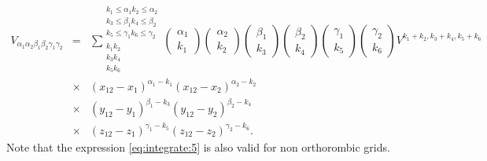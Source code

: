 \documentclass[prb]{revtex4}
\begin{document}
\begin{eqnarray}
  \label{eq:integrate:5}
  V_{\alpha_1\alpha_2\beta_1\beta_2\gamma_1\gamma_2} &=& \sum_{\substack{k_1 k_2\\
      k_3 k_4\\
      k_5 k_6}}^{\substack{k_1\leq \alpha_1k_2\leq\alpha_2\\
    k_3\leq\beta_1k_4\leq\beta_2\\
    k_5\leq\gamma_1k_6\leq\gamma_2}} \left(\begin{array}{c}
    \alpha_1\\ k_1
  \end{array}\right)\left(\begin{array}{c}
    \alpha_2\\ k_2
  \end{array}\right)\left(\begin{array}{c}
    \beta_1\\ k_3
  \end{array}\right)\left(\begin{array}{c}
    \beta_2\\ k_4
  \end{array}\right)\left(\begin{array}{c}
    \gamma_1\\ k_5
  \end{array}\right)\left(\begin{array}{c}
    \gamma_2\\ k_6
  \end{array}\right)V^{k_1 + k_2,k_3+k_4,k_5+k_6}\nonumber\\
  &\times&  (x_{12} - x_1)^{\alpha_1 - k_1} (x_{12} - x_2)^{\alpha_2 - k_2} \nonumber\\
  &\times& (y_{12} - y_1)^{\beta_1 - k_3} (y_{12} - y_2)^{\beta_2 - k_4} \nonumber\\
  &\times&(z_{12} - z_1)^{\gamma_1 - k_5} (z_{12} - z_2)^{\gamma_2 - k_6}.
\end{eqnarray}
Note that the expression \ref{eq:integrate:5} is also valid for non orthorombic
grids.
\end{document}
